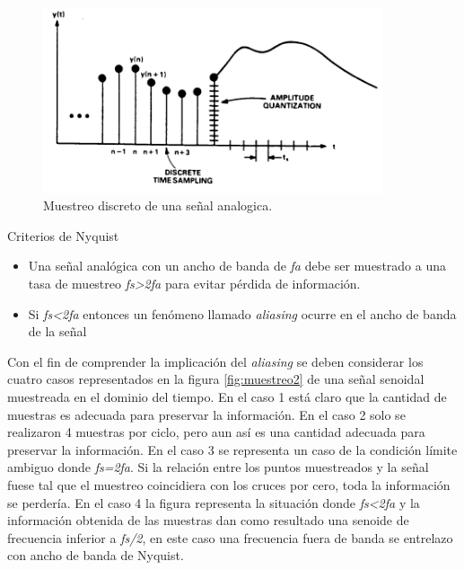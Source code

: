 \begin{figure}[ht]
	\centering
	\includegraphics[width=100mm]{./Figures/muestreo1.png}
	\caption{Muestreo discreto de una señal analogica.}
	\label{fig:muestreo1}
\end{figure}

Criterios de Nyquist
\begin{itemize}
\item Una señal analógica con un ancho de banda de \textit{fa} debe ser muestrado a una tasa de muestreo \textit{fs>2fa} para evitar pérdida de información.
\item Si \textit{fs<2fa} entonces un fenómeno llamado \textit{aliasing} ocurre en el ancho de banda de la señal
\end{itemize}

Con el fin de comprender la implicación del \textit{aliasing} se deben considerar los cuatro casos representados en la figura \ref{fig:muestreo2} de una señal senoidal muestreada en el dominio del tiempo.
En el caso 1 está claro que la cantidad de muestras es adecuada para preservar la información. En el caso 2 solo se realizaron 4 muestras por ciclo, pero aun así es una cantidad adecuada para preservar la información. En el caso 3 se representa un caso de la condición límite ambiguo donde \textit{fs=2fa}. Si la relación entre los puntos muestreados y la señal fuese tal que el muestreo coincidiera con los cruces por cero, toda la información se perdería. En el caso 4 la figura representa la situación donde \textit{fs<2fa} y la información obtenida de las muestras dan como resultado una senoide de frecuencia inferior a \textit{fs/2}, en este caso una frecuencia fuera de banda se entrelazo con ancho de banda de Nyquist. 

